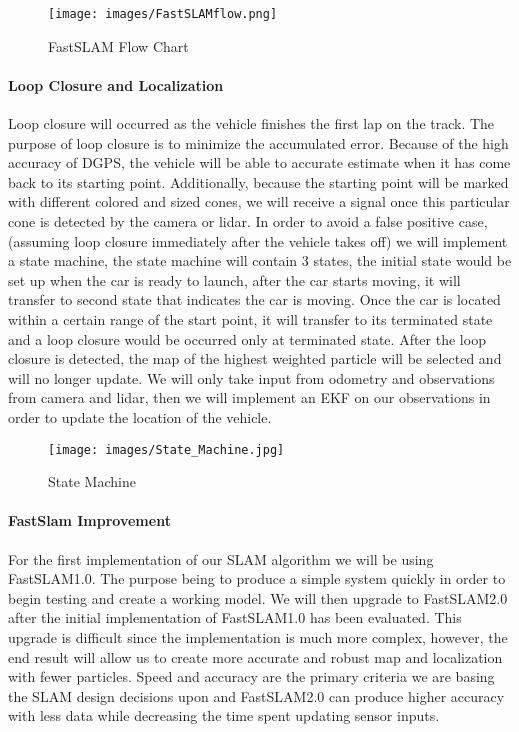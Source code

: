 \documentclass[10pt, onecolumn, draftclsnofoot, letterpaper,compsoc]{IEEEtran}
\begin{document}
\begin{figure}[H]
\label{fig:FastSLAM}
\centering
\caption{FastSLAM Flow Chart}
\texttt{[image: images/FastSLAMflow.png]}
\end{figure}

\paragraph{Loop Closure and Localization}
Loop closure will occurred as the vehicle finishes the first lap on the track. The purpose of loop closure is to minimize the accumulated error. Because of the high accuracy of DGPS, the vehicle will be able to accurate estimate when it has come back to its starting point. Additionally, because the starting point will be marked with different colored and sized cones, we will receive a signal once this particular cone is detected by the camera or lidar. In order to avoid a false positive case, (assuming loop closure immediately after the vehicle takes off) we will implement a state machine, the state machine will contain 3 states, the initial state would be set up when the car is ready to launch, after the car starts moving, it will transfer to second state that indicates the car is moving. Once the car is located within a certain range of the start point, it will transfer to its terminated state and a loop closure would be occurred only at terminated state. After the loop closure is detected, the map of the highest weighted particle will be selected and will no longer update. We will only take input from odometry and observations from camera and lidar, then we will implement an EKF on our observations in order to update the location of the vehicle.
\begin{figure}[H]
    \centering
    \caption{State Machine}
    \texttt{[image: images/State\_Machine.jpg]}
    \label{fig:State_Machine}
\end{figure}

\paragraph{FastSlam Improvement}
For the first implementation of our SLAM algorithm we will be using FastSLAM1.0. The purpose being to produce a simple system quickly in order to begin testing and create a working model. We will then upgrade to FastSLAM2.0 after the initial implementation of FastSLAM1.0 has been evaluated. This upgrade is difficult since the implementation is much more complex, however, the end result will allow us to create more accurate and robust map and localization with fewer particles. Speed and accuracy are the primary criteria we are basing the SLAM design decisions upon and FastSLAM2.0 can produce higher accuracy with less data while decreasing the time spent updating sensor inputs.  
\end{document}
